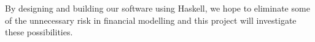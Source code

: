 \documentclass[11pt]{article}
\newcommand{\comm}[2]{{\sf \(\spadesuit\){\bf #1: }{\rm \sf #2}\(\spadesuit\)}}
\newcommand{\mcomm}[2]{\marginpar{\scriptsize \comm{#1}{#2}}}
\newcommand{\ab}[1]{\mcomm{AB}{#1}}
\begin{document}
By designing and building our software using Haskell, we hope to eliminate some
of the unnecessary risk in financial modelling and this project will investigate these possibilities.\\

\end{document}
